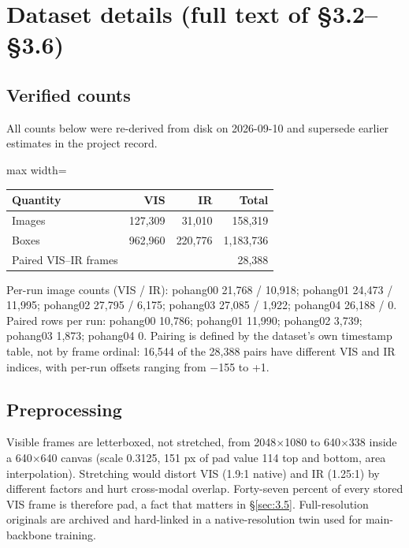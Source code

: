 \documentclass[10pt]{article}
\begin{document}
\section{Dataset details (full text of \S3.2--\S3.6)}\label{app:B}
\subsection{Verified counts}\label{app:B.1}
All counts below were re-derived from disk on 2026-09-10 and supersede earlier estimates in the project record.

\begin{center}
\small
\begin{adjustbox}{max width=\linewidth}
\begin{tabular}{lrrr}
\toprule
Quantity & VIS & IR & Total \\
\midrule
Images & 127,309 & 31,010 & 158,319 \\
Boxes & 962,960 & 220,776 & 1,183,736 \\
Paired VIS--IR frames &  &  & 28,388 \\
\bottomrule
\end{tabular}
\end{adjustbox}
\end{center}

Per-run image counts (VIS / IR): pohang00 21,768 / 10,918; pohang01 24,473 / 11,995; pohang02 27,795 / 6,175; pohang03 27,085 / 1,922; pohang04 26,188 / 0. Paired rows per run: pohang00 10,786; pohang01 11,990; pohang02 3,739; pohang03 1,873; pohang04 0. Pairing is defined by the dataset's own timestamp table, not by frame ordinal: 16,544 of the 28,388 pairs have different VIS and IR indices, with per-run offsets ranging from $-$155 to +1.

\subsection{Preprocessing}\label{app:B.2}
Visible frames are letterboxed, not stretched, from 2048$\times$1080 to 640$\times$338 inside a 640$\times$640 canvas (scale 0.3125, 151 px of pad value 114 top and bottom, area interpolation). Stretching would distort VIS (1.9:1 native) and IR (1.25:1) by different factors and hurt cross-modal overlap. Forty-seven percent of every stored VIS frame is therefore pad, a fact that matters in \S\ref{sec:3.5}. Full-resolution originals are archived and hard-linked in a native-resolution twin used for main-backbone training.
\end{document}
